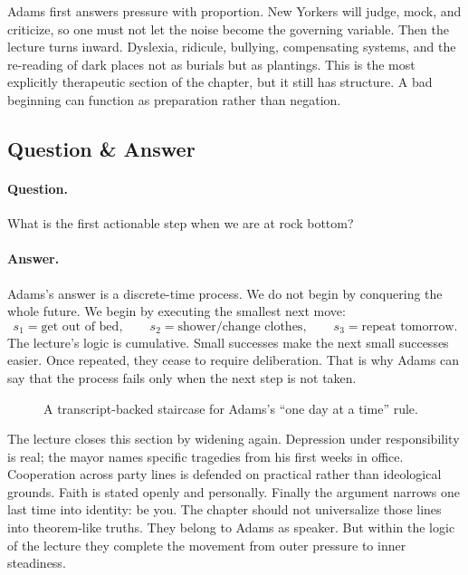 Adams first answers pressure with proportion. New Yorkers will judge, mock, and criticize, so one must not let the noise become the governing variable. Then the lecture turns inward. Dyslexia, ridicule, bullying, compensating systems, and the re-reading of dark places not as burials but as plantings. This is the most explicitly therapeutic section of the chapter, but it still has structure. A bad beginning can function as preparation rather than negation.

\subsection{Question \& Answer}

\paragraph{Question.} What is the first actionable step when we are at rock bottom?

\paragraph{Answer.} Adams's answer is a discrete-time process. We do not begin by conquering the whole future. We begin by executing the smallest next move:
\begin{equation}
s_1=\text{get out of bed},\qquad
s_2=\text{shower/change clothes},\qquad
s_3=\text{repeat tomorrow}.
\end{equation}
The lecture's logic is cumulative. Small successes make the next small successes easier. Once repeated, they cease to require deliberation. That is why Adams can say that the process fails only when the next step is not taken.

\begin{figure}
\centering
{}
\caption{A transcript-backed staircase for Adams's ``one day at a time'' rule.}
\end{figure}

The lecture closes this section by widening again. Depression under responsibility is real; the mayor names specific tragedies from his first weeks in office. Cooperation across party lines is defended on practical rather than ideological grounds. Faith is stated openly and personally. Finally the argument narrows one last time into identity: be you. The chapter should not universalize those lines into theorem-like truths. They belong to Adams as speaker. But within the logic of the lecture they complete the movement from outer pressure to inner steadiness.

